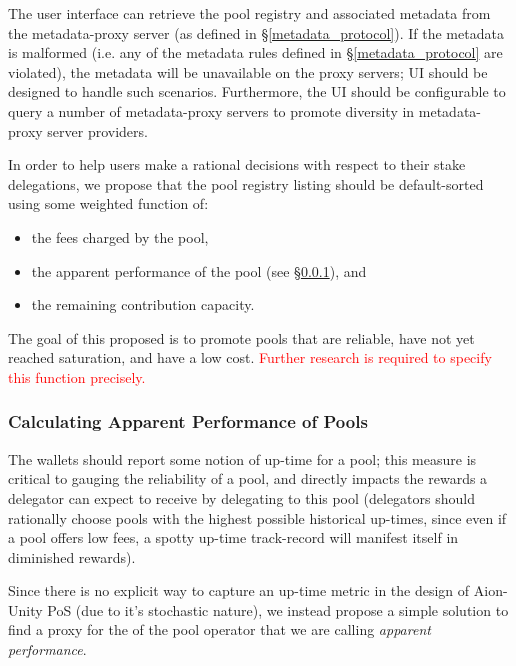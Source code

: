 The user interface can retrieve the pool registry and associated metadata from the metadata-proxy server (as defined in \S\ref{metadata_protocol}). If the metadata is malformed (i.e. any of the metadata rules defined in \S\ref{metadata_protocol} are violated), the metadata will be unavailable on the proxy servers; UI should be designed to handle such scenarios. Furthermore, the UI should be configurable to query a number of metadata-proxy servers to promote diversity in metadata-proxy server providers. 

In order to help users make a rational decisions with respect to their stake delegations, we propose that the pool registry listing should be default-sorted using some weighted function of:  
\begin{itemize}[label=--,nosep]
    \item the fees charged by the pool, 
    \item the apparent performance of the pool (see \S\ref{apparent_perf}), and
    \item the remaining contribution capacity.
\end{itemize}
The goal of this proposed  is to promote pools that are reliable, have not yet reached saturation, and have a low cost. \textcolor{red}{Further research is required to specify this function precisely.}  

\subsubsection{Calculating Apparent Performance of Pools} \label{apparent_perf}

The wallets should report some notion of up-time for a pool; this measure is critical to gauging the reliability of a pool, and directly impacts the rewards a delegator can expect to receive by delegating to this pool (delegators should rationally choose pools with the highest possible historical up-times, since even if a pool offers low fees, a spotty up-time track-record will manifest itself in diminished rewards). 

Since there is no explicit way to capture an up-time metric in the design of Aion-Unity PoS (due to it's stochastic nature), we instead propose a simple solution to find a proxy for the  of the pool operator that we are calling \textit{apparent performance}. 

